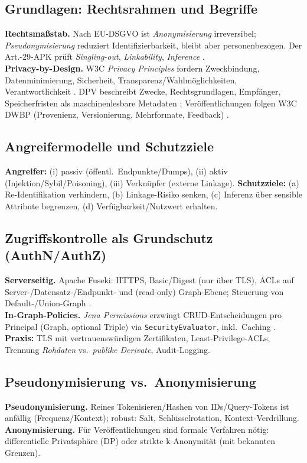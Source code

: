 \subsection{Grundlagen: Rechtsrahmen und Begriffe}
\textbf{Rechtsmaßstab.} Nach EU-DSGVO ist \emph{Anonymisierung} irreversibel; \emph{Pseudonymisierung} reduziert Identifizierbarkeit, bleibt aber personenbezogen. Der Art.-29-APK prüft \emph{Singling-out}, \emph{Linkability}, \emph{Inference} \cite{Art29WPAnonymisation,enisa2019pseudonymisation}. \\
\textbf{Privacy-by-Design.} W3C \emph{Privacy Principles} fordern Zweckbindung, Datenminimierung, Sicherheit, Transparenz/Wahlmöglichkeiten, Verantwortlichkeit \cite{W3CPrivacyPrinciples}. DPV beschreibt Zwecke, Rechtsgrundlagen, Empfänger, Speicherfristen als maschinenlesbare Metadaten \cite{W3CDPV}; Veröffentlichungen folgen W3C DWBP (Provenienz, Versionierung, Mehrformate, Feedback) \cite{W3CDWBP}.

\subsection{Angreifermodelle und Schutzziele}
\textbf{Angreifer:} (i) passiv (öffentl.\ Endpunkte/Dumps), (ii) aktiv (Injektion/Sybil/Poisoning), (iii) Verknüpfer (externe Linkage). \textbf{Schutzziele:} (a) Re-Identifikation verhindern, (b) Linkage-Risiko senken, (c) Inferenz über sensible Attribute begrenzen, (d) Verfügbarkeit/Nutzwert erhalten.

\subsection{Zugriffskontrolle als Grundschutz (AuthN/AuthZ)}
\textbf{Serverseitig.} Apache Fuseki: HTTPS, Basic/Digest (nur über TLS), ACLs auf Server-/Datensatz-/Endpunkt- und (read-only) Graph-Ebene; Steuerung von Default-/Union-Graph \cite{FusekiAccess}. \\
\textbf{In-Graph-Policies.} \emph{Jena Permissions} erzwingt CRUD-Entscheidungen pro Principal (Graph, optional Triple) via \texttt{SecurityEvaluator}, inkl.\ Caching \cite{JenaPermissions}. \\
\textbf{Praxis:} TLS mit vertrauenswürdigen Zertifikaten, Least-Privilege-ACLs, Trennung \emph{Rohdaten} vs.\ \emph{publike Derivate}, Audit-Logging.

\subsection{Pseudonymisierung vs.\ Anonymisierung}
\textbf{Pseudonymisierung.} Reines Tokenisieren/Hashen von IDs/Query-Tokens ist anfällig (Frequenz/Kontext); robust: Salt, Schlüsselrotation, Kontext-Verdrillung. \\
\textbf{Anonymisierung.} Für Veröffentlichungen sind formale Verfahren nötig: differentielle Privatsphäre (DP) oder strikte k-Anonymität (mit bekannten Grenzen).

